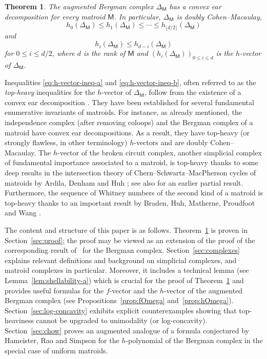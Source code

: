 \documentclass[11pt]{amsart}
\theoremstyle{theorems}
\newtheorem{theorem}{Theorem}[section]
\theoremstyle{definition}
\newcommand{\M}{{\mathsf{M}}}
\begin{document}
\begin{theorem} \label{thm:main}
    The augmented Bergman complex $\Delta_{\M}$ has a 
    convex ear decomposition for every matroid $\M$. 
    In particular, $\Delta_{\M}$ is doubly Cohen--Macaulay,
    \begin{equation} \label{eq:h-vector-ineq-a}
    h_0(\Delta_{\M}) \le h_1(\Delta_{\M}) \le \cdots \le
    h_{\lfloor d/2 \rfloor}(\Delta_{\M})
    \end{equation}
    and
    \begin{equation} \label{eq:h-vector-ineq-b}
    h_i(\Delta_{\M}) \le h_{d-i}(\Delta_{\M})
    \end{equation}
    for $0 \le i \le d/2$, where $d$ is the rank of $\M$ and
		$(h_i(\Delta_{\M}))_{0 \le i \le d}$ is the $h$-vector 
		of $\Delta_{\M}$.
\end{theorem}


Inequalities \eqref{eq:h-vector-ineq-a} and \eqref{eq:h-vector-ineq-b}, 
often referred to as the \emph{top-heavy} inequalities for the $h$-vector 
of $\Delta_{\M}$, follow from the existence of a convex ear decomposition
\cite{Ch97}. They have been established for several fundamental 
enumerative invariants of matroids. For instance, as already mentioned, 
the independence complex (after removing coloops) and the Bergman complex 
of a matroid have convex ear decompositions. As a result, they have 
top-heavy (or strongly flawless, in other terminology) $h$-vectors and 
are doubly Cohen--Macaulay. The $h$-vector of the broken circuit 
complex, another simplicial complex of fundamental importance associated 
to a matroid, is top-heavy thanks to some deep results in the intersection 
theory of Chern--Schwartz--MacPherson cycles of matroids by Ardila, Denham 
and Huh \cite{ADH23}; see also \cite{KV16} for an earlier partial result. 
Furthermore, the sequence of Whitney numbers of the second kind of a 
matroid is top-heavy thanks to an important result by Braden, Huh, 
Matherne, Proudfoot and Wang \cite[Theorem~1.1]{BHMPW2}.

The content and structure of this paper is as follows. 
Theorem~\ref{thm:main} is proven in Section~\ref{sec:proof}; the proof 
may be viewed as an extension of the proof of the corresponding result 
of~\cite{NS04} for the Bergman complex. Section~\ref{sec:complexes} 
explains relevant definitions and background on simplicial complexes, 
and matroid complexes in particular. Moreover, it includes a technical 
lemma (see Lemma~\ref{lem:shellability-a}) which is crucial for the 
proof of Theorem~\ref{thm:main} and provides useful formulas for the 
$f$-vector and the $h$-vector of the augmented Bergman complex (see 
Propositions~\ref{prop:fOmega} and~\ref{prop:hOmega}). 
Section~\ref{sec:log-concavity} exhibits explicit counterexamples showing that top-heaviness cannot be upgraded to unimodality (or log-concavity).
Section~\ref{sec:chow} proves 
an augmented analogue of a formula conjectured by Hameister, Rao and 
Simpson \cite{HRS21} for the $h$-polynomial of the Bergman complex 
in the special case of uniform matroids.
\end{document}
